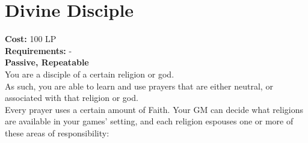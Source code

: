 \section{Divine Disciple}\label{perk:divineDisciple}
\textbf{Cost:} 100 LP\\
\textbf{Requirements:} - \\
\textbf{Passive, Repeatable}\\
You are a disciple of a certain religion or god.\\
As such, you are able to learn and use prayers that are either neutral, or associated with that religion or god.\\
Every prayer uses a certain amount of Faith.
Your GM can decide what religions are available in your games' setting, and each religion espouses one or more of these areas of responsibility:\\

